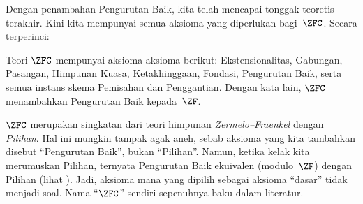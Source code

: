 \documentclass[../../../include/open-logic-section]{subfiles}
\begin{document}

Dengan penambahan Pengurutan Baik, kita telah mencapai tonggak teoretis
terakhir. Kini kita mempunyai semua aksioma yang diperlukan bagi~$\ZFC$.
Secara terperinci:

\begin{defn}
Teori $\ZFC$ mempunyai aksioma-aksioma berikut: Ekstensionalitas, Gabungan,
Pasangan, Himpunan Kuasa, Ketakhinggaan, Fondasi, Pengurutan Baik, serta semua
instans skema Pemisahan dan Penggantian. Dengan kata lain, $\ZFC$ menambahkan
Pengurutan Baik kepada~$\ZF$.
\end{defn}

$\ZFC$ merupakan singkatan dari teori himpunan
\emph{Zermelo--Fraenkel} dengan \emph{Pilihan}. Hal ini mungkin tampak agak
aneh, sebab aksioma yang kita tambahkan disebut ``Pengurutan Baik'', bukan
``Pilihan''. Namun, ketika kelak kita merumuskan {Pilihan}, ternyata
Pengurutan Baik ekuivalen (modulo~$\ZF$) dengan Pilihan (lihat
). Jadi, aksioma mana yang dipilih
sebagai aksioma ``dasar'' tidak menjadi soal. Nama ``$\ZFC$'' sendiri
sepenuhnya baku dalam literatur.
\end{document}
